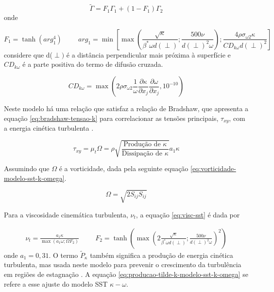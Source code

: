 \begin{equation}
	\label{eq:funcaomistura-modelo-sst-k-omega}
    \tilde{\Gamma} = F_1 \Gamma_1 + (1 - F_1) \Gamma_2
\end{equation}
%
onde 

\begin{equation}
		F_1 = \tanh{(arg_1^{4})}
		\hspace{1cm}
    	arg_1 = \min\left[\max\left(\frac{\sqrt{\kappa}}{\beta^{*}\omega d(\perp)};\frac{500\nu}{d(\perp)^2 \omega}\right);\frac{4\rho\sigma_{\omega 2}\kappa}{CD_{k\omega}d(\perp)^2}\right]
\end{equation}
%
considere que d(\(\perp)\) é a distância perpendicular mais próxima à superfície e \(CD_{k\omega}\) é a parte positiva do termo de difusão cruzada.

\begin{equation}
    CD_{k\omega} = \max\left(2\rho\sigma_{\omega 2}\frac{1}{\omega}\frac{\partial \kappa}{\partial x_j}\frac{\partial \omega}{\partial x_j}, 10^{-10} \right)
\end{equation}

Neste modelo há uma relação que satisfaz a relação de Bradshaw, que apresenta a equação \ref{eq:bradshaw-tensao-k} para correlacionar as tensões principais, \(\tau_{xy}\), com a energia cinética turbulenta \cite{Menter1994TwoequationET}.

\begin{equation}
	\label{eq:bradshaw-tensao-k}
	\tau_{xy} = \mu_{t}\Omega = \rho\sqrt{\frac{\text{Produção de }\kappa}{\text{Dissipação de }\kappa}}a_{1}\kappa
\end{equation}

Assumindo que \(\Omega\) é a vorticidade, dada pela seguinte equação \ref{eq:vorticidade-modelo-sst-k-omega}.

\begin{equation}
	\label{eq:vorticidade-modelo-sst-k-omega}
	\Omega = \sqrt{2 S_{ij}S_{ij}}
\end{equation}

Para a viscosidade cinemática turbulenta, \(\nu_t\), a equação \ref{eq:visc-sst} é dada por

\begin{equation}
\begin{split}
    \label{eq:visc-sst}
    \nu_t = \frac{a_1 \kappa}{\max(a_1 \omega;\Omega F_2)} \hspace{1cm}
    F_2 = \tanh{\left(\max\left(2\frac{\sqrt{\kappa}}{\beta^{*}\omega d(\perp)}; \frac{500\nu}{ d(\perp)^2\omega}\right)^{2}\right)} 
\end{split}
\end{equation}
%
onde \(a_1 = 0,31\). O termo \(\tilde{P}_{\kappa}\) também significa a produção de energia cinética turbulenta, mas usada neste modelo para prevenir o crescimento da turbulência em regiões de estagnação \cite{Menter2009}. A equação \ref{eq:producao-tilde-k-modelo-sst-k-omega} se refere a esse ajuste do modelo SST \(\kappa-\omega\).


